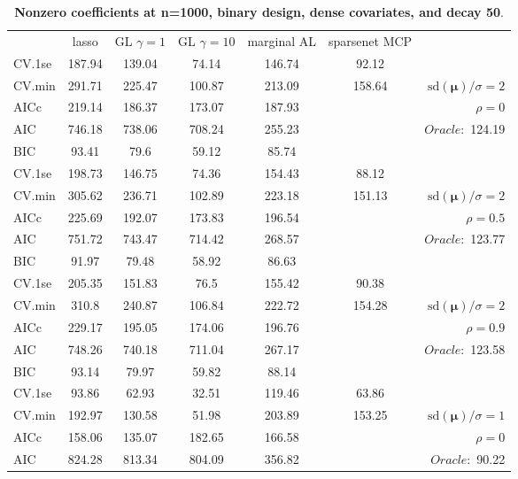 \clearpage
\begin{table}\vspace{-.5cm}
\caption[l]{ { \bf Nonzero coefficients at n=1000, binary design, 
dense covariates, and  decay  50}.}
\vspace{-.5cm}
\footnotesize{}
\begin{center}
\begin{tabular}{l*{5}{c}|r}
& lasso & GL $\gamma=1$ & GL $\gamma=10$ & marginal AL & sparsenet MCP  & \\
 \cline{1-7}
CV.1se & 187.94 & 139.04 & 74.14 & 146.74 & 92.12 & \\
CV.min & 291.71 & 225.47 & 100.87 & 213.09 & 158.64 &  $\mathrm{sd}(\mathbf{\mu})/\sigma=2$ \\
AICc & 219.14 & 186.37 & 173.07 & 187.93 & & $\rho=0$ \\
AIC & 746.18 & 738.06 & 708.24 & 255.23 & &  \multirow{2}{*}{$Oracle: $ 124.19} \\
BIC & 93.41 & 79.6 & 59.12 & 85.74 & &  \\
 \hline 
CV.1se & 198.73 & 146.75 & 74.36 & 154.43 & 88.12 & \\
CV.min & 305.62 & 236.71 & 102.89 & 223.18 & 151.13 &  $\mathrm{sd}(\mathbf{\mu})/\sigma=2$ \\
AICc & 225.69 & 192.07 & 173.83 & 196.54 & & $\rho=0.5$ \\
AIC & 751.72 & 743.47 & 714.42 & 268.57 & &  \multirow{2}{*}{$Oracle: $ 123.77} \\
BIC & 91.97 & 79.48 & 58.92 & 86.63 & &  \\
 \hline 
CV.1se & 205.35 & 151.83 & 76.5 & 155.42 & 90.38 & \\
CV.min & 310.8 & 240.87 & 106.84 & 222.72 & 154.28 &  $\mathrm{sd}(\mathbf{\mu})/\sigma=2$ \\
AICc & 229.17 & 195.05 & 174.06 & 196.76 & & $\rho=0.9$ \\
AIC & 748.26 & 740.18 & 711.04 & 267.17 & &  \multirow{2}{*}{$Oracle: $ 123.58} \\
BIC & 93.14 & 79.97 & 59.82 & 88.14 & &  \\
 \hline 
CV.1se & 93.86 & 62.93 & 32.51 & 119.46 & 63.86 & \\
CV.min & 192.97 & 130.58 & 51.98 & 203.89 & 153.25 &  $\mathrm{sd}(\mathbf{\mu})/\sigma=1$ \\
AICc & 158.06 & 135.07 & 182.65 & 166.58 & & $\rho=0$ \\
AIC & 824.28 & 813.34 & 804.09 & 356.82 & &  \multirow{2}{*}{$Oracle: $ 90.22} \\

\end{tabular}
\end{center}
\end{table}
